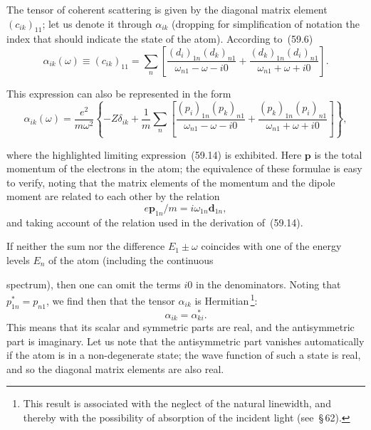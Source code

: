 The tensor of coherent scattering is given by the diagonal matrix element $(c_{ik})_{11}$; let us denote it through $\alpha_{ik}$ (dropping for simplification of notation the index that should indicate the state of the atom). According to~(59.6)
\begin{equation}
\alpha_{ik}(\omega) \equiv (c_{ik})_{11} = \sum_n\left[\frac{(d_i)_{1n}(d_k)_{n1}}{\omega_{n1} - \omega - i0} + \frac{(d_k)_{1n}(d_i)_{n1}}{\omega_{n1} + \omega + i0}\right].
\tag{59.17}
\end{equation}

This expression can also be represented in the form
\begin{equation}
\alpha_{ik}(\omega) = \frac{e^2}{m\omega^2}\left\{-Z\delta_{ik} + \frac{1}{m}\sum_n\left[\frac{(p_i)_{1n}(p_k)_{n1}}{\omega_{n1} - \omega - i0} + \frac{(p_k)_{1n}(p_i)_{n1}}{\omega_{n1} + \omega + i0}\right]\right\},
\tag{59.18}
\end{equation}

where the highlighted limiting expression~(59.14) is exhibited. Here $\mathbf{p}$ is the total momentum of the electrons in the atom; the equivalence of these formulae is easy to verify, noting that the matrix elements of the momentum and the dipole moment are related to each other by the relation
\[
e\mathbf{p}_{1n}/m = i\omega_{1n}\mathbf{d}_{1n},
\]
and taking account of the relation used in the derivation of~(59.14).

If neither the sum nor the difference $E_1 \pm \omega$ coincides with one of the energy levels $E_n$ of the atom (including the continuous

spectrum), then one can omit the terms $i0$ in the denominators. Noting that $p^*_{1n} = p_{n1}$, we find then that the tensor $\alpha_{ik}$ is Hermitian\,\footnote{This result is associated with the neglect of the natural linewidth, and thereby with the possibility of absorption of the incident light (see~\S\,62).}:
\begin{equation}
\alpha_{ik} = \alpha^*_{ki}.
\tag{59.19}
\end{equation}
This means that its scalar and symmetric parts are real, and the antisymmetric part is imaginary. Let us note that the antisymmetric part vanishes automatically if the atom is in a non-degenerate state; the wave function of such a state is real, and so the diagonal matrix elements are also real.

